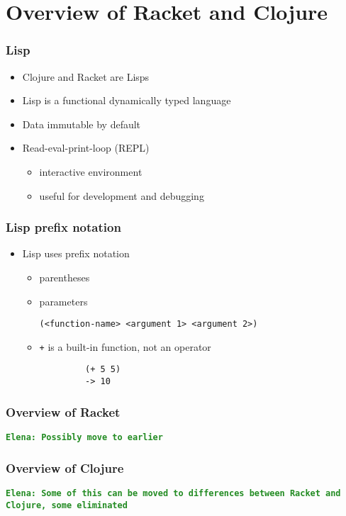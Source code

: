 \documentclass{beamer}
\newcommand{\comment}[1]{{\bf \tt  {#1}}}
\newcommand{\emcomment}[1]{\textcolor{ForestGreen}{\comment{Elena: {#1}}}}
\begin{document}
\section{Overview of Racket and Clojure}

\begin{frame}
\frametitle{Lisp}
	\begin{itemize}
		\item Clojure and Racket are Lisps
		\item Lisp is a functional dynamically typed language
		\item Data immutable by default
  			\item Read-eval-print-loop (REPL)
  	 		\begin{itemize}
  	 		\item interactive environment
  	 		\item useful for development and debugging
  	 	\end{itemize}
	\end{itemize}
\end{frame}

\begin{frame}[fragile]
\frametitle{Lisp prefix notation}
	\begin{itemize}
  	  \item Lisp uses prefix notation
  	  \begin{itemize}
  	 	 \item parentheses
  	 	 \item parameters
  	 	 
  	 	 \texttt{(<function-name> <argument 1> <argument 2>)}
  	 	 \item \texttt{+} is a built-in function, not an operator
  	 	 \begin{verbatim}		
		 (+ 5 5)
		 -> 10
	     \end{verbatim}
	  \end{itemize}
   \end{itemize}
\end{frame}

\begin{frame}
\frametitle{Overview of Racket}
\emcomment{Possibly move to earlier}
\end{frame}

\begin{frame}
\frametitle{Overview of Clojure}
\emcomment{Some of this can be moved to differences between Racket and Clojure, some eliminated}
\end{frame}
\end{document}
